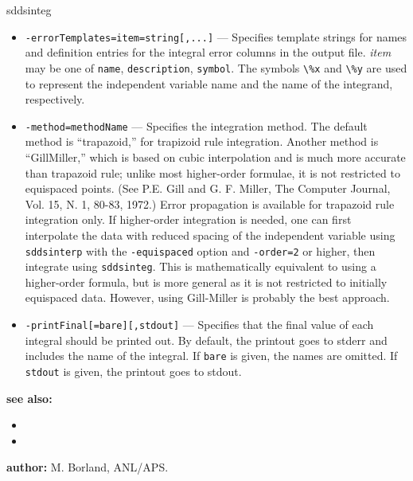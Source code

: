 \begin{sddsprog}{sddsinteg}
\begin{itemize}
      \item \verb|-errorTemplates=item=string[,...]| --- Specifies template strings for names and definition entries for the integral error columns in the output file. {\em item} may be one of \verb|name|, \verb|description|, \verb|symbol|. The symbols \verb|\%x| and \verb|\%y| are used to represent the independent variable name and the name of the integrand, respectively.
      \item \verb|-method=methodName| --- Specifies the integration method. The default method is ``trapazoid,'' for trapizoid rule integration. Another method is ``GillMiller,'' which is based on cubic interpolation and is much more accurate than trapazoid rule; unlike most higher-order formulae, it is not restricted to equispaced points. (See P.E. Gill and G. F. Miller, The Computer Journal, Vol. 15, N. 1, 80-83, 1972.) Error propagation is available for trapazoid rule integration only. If higher-order integration is needed, one can first interpolate the data with reduced spacing of the independent variable using \verb|sddsinterp| with the \verb|-equispaced| option and \verb|-order=2| or higher, then integrate using \verb|sddsinteg|. This is mathematically equivalent to using a higher-order formula, but is more general as it is not restricted to initially equispaced data. However, using Gill-Miller is probably the best approach.
      \item \verb|-printFinal[=bare][,stdout]| --- Specifies that the final value of each integral should be printed out. By default, the printout goes to stderr and includes the name of the integral. If \verb|bare| is given, the names are omitted. If \verb|stdout| is given, the printout goes to stdout.
    \end{itemize}
  \item \textbf{see also:}
    \begin{itemize}
      \item {}
      \item {}
    \end{itemize}
  \item \textbf{author:} M. Borland, ANL/APS.
\end{sddsprog}

